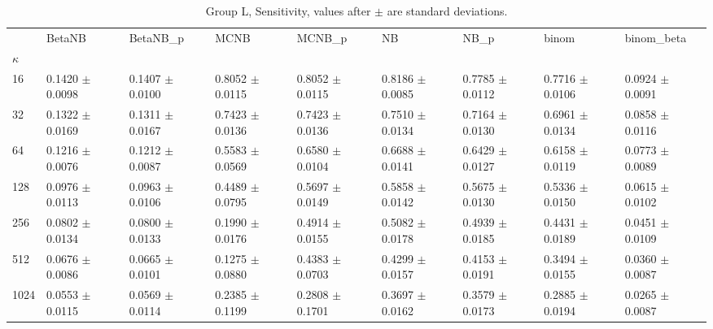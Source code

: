 \begin{table}[H]
\centering
\begin{adjustbox}{max width=\linewidth}
\begin{tabular}{lllllllll}
\toprule
 & BetaNB & BetaNB\_p & MCNB & MCNB\_p & NB & NB\_p & binom & binom\_beta \\
$\kappa$ &  &  &  &  &  &  &  &  \\
\midrule
16 & 0.1420 $\pm$ 0.0098 & 0.1407 $\pm$ 0.0100 & 0.8052 $\pm$ 0.0115 & 0.8052 $\pm$ 0.0115 & 0.8186 $\pm$ 0.0085 & 0.7785 $\pm$ 0.0112 & 0.7716 $\pm$ 0.0106 & 0.0924 $\pm$ 0.0091 \\
32 & 0.1322 $\pm$ 0.0169 & 0.1311 $\pm$ 0.0167 & 0.7423 $\pm$ 0.0136 & 0.7423 $\pm$ 0.0136 & 0.7510 $\pm$ 0.0134 & 0.7164 $\pm$ 0.0130 & 0.6961 $\pm$ 0.0134 & 0.0858 $\pm$ 0.0116 \\
64 & 0.1216 $\pm$ 0.0076 & 0.1212 $\pm$ 0.0087 & 0.5583 $\pm$ 0.0569 & 0.6580 $\pm$ 0.0104 & 0.6688 $\pm$ 0.0141 & 0.6429 $\pm$ 0.0127 & 0.6158 $\pm$ 0.0119 & 0.0773 $\pm$ 0.0089 \\
128 & 0.0976 $\pm$ 0.0113 & 0.0963 $\pm$ 0.0106 & 0.4489 $\pm$ 0.0795 & 0.5697 $\pm$ 0.0149 & 0.5858 $\pm$ 0.0142 & 0.5675 $\pm$ 0.0130 & 0.5336 $\pm$ 0.0150 & 0.0615 $\pm$ 0.0102 \\
256 & 0.0802 $\pm$ 0.0134 & 0.0800 $\pm$ 0.0133 & 0.1990 $\pm$ 0.0176 & 0.4914 $\pm$ 0.0155 & 0.5082 $\pm$ 0.0178 & 0.4939 $\pm$ 0.0185 & 0.4431 $\pm$ 0.0189 & 0.0451 $\pm$ 0.0109 \\
512 & 0.0676 $\pm$ 0.0086 & 0.0665 $\pm$ 0.0101 & 0.1275 $\pm$ 0.0880 & 0.4383 $\pm$ 0.0703 & 0.4299 $\pm$ 0.0157 & 0.4153 $\pm$ 0.0191 & 0.3494 $\pm$ 0.0155 & 0.0360 $\pm$ 0.0087 \\
1024 & 0.0553 $\pm$ 0.0115 & 0.0569 $\pm$ 0.0114 & 0.2385 $\pm$ 0.1199 & 0.2808 $\pm$ 0.1701 & 0.3697 $\pm$ 0.0162 & 0.3579 $\pm$ 0.0173 & 0.2885 $\pm$ 0.0194 & 0.0265 $\pm$ 0.0087 \\
\bottomrule
\end{tabular}

\end{adjustbox}
\caption{Group L, Sensitivity, values after $\pm$ are standard deviations.}
\end{table}

